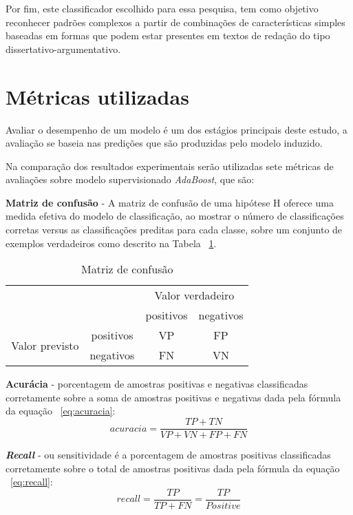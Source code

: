 Por fim, este classificador escolhido para essa pesquisa, tem como objetivo reconhecer padrões complexos a partir de combinações de características simples baseadas em formas que podem estar presentes em textos de redação do tipo dissertativo-argumentativo.

\section{Métricas utilizadas}

Avaliar o desempenho de um modelo é um dos estágios principais deste estudo, a avaliação se baseia nas predições que são produzidas pelo modelo induzido. 

Na comparação dos resultados experimentais serão utilizadas sete métricas de avaliações sobre modelo supervisionado \textit{AdaBoost}, que são:

\textbf{Matriz de confusão} - A matriz de confusão de uma hipótese H oferece uma medida efetiva do modelo de classificação, ao mostrar o número de classificações corretas versus as classificações preditas para cada classe, sobre um conjunto de exemplos verdadeiros como descrito na Tabela ~\ref{tab:matrix_confusion}.

\begin{table}[H]
\centering
\caption{Matriz de confusão}
\begin{tabular}{rc|c|c|}
\cline{3-4}
\multicolumn{2}{c|}{\multirow{2}{*}{}} & \multicolumn{2}{c|}{Valor verdadeiro} \\ \cline{3-4} 
\multicolumn{2}{c|}{} & positivos & negativos \\ \hline
\multicolumn{1}{|c|}{\multirow{2}{*}{Valor previsto}} & positivos & VP & FP \\ \cline{2-4} 
\multicolumn{1}{|c|}{} & negativos & FN & VN \\ \hline
\end{tabular}
\label{tab:matrix_confusion}
\end{table}


\textbf{Acurácia} - porcentagem de amostras positivas e negativas classificadas corretamente sobre a soma de amostras positivas e negativas dada pela fórmula da equação ~\ref{eq:acuracia}:
\begin{equation} \label{eq:acuracia}
 acuracia = \frac{TP+TN}{VP+VN+FP+FN}
\end{equation}

\textbf{\textit{Recall}} - ou sensitividade é a porcentagem de amostras positivas classificadas corretamente sobre o total de amostras positivas dada pela fórmula da equação ~\ref{eq:recall}:
\begin{equation} \label{eq:recall}
  recall = \frac{TP}{TP+FN} = \frac{TP}{\textit{Positive}}
\end{equation}

